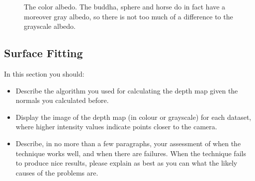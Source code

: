 \documentclass{paper}
\begin{document}
\begin{figure}[h!]
\begin{subfigure}{0.3\textwidth}
        \end{subfigure}
        \caption{The color albedo. The buddha, sphere and horse
        do in fact have a moreover gray albedo, so there is not too much
        of a difference to the grayscale albedo.}
        \label{fig:color_albedo}
\end{figure}

\subsection{Surface Fitting}

In this section you should:

\begin{itemize}
\item Describe the algorithm you used for calculating the depth map given the normals you calculated before.
\item Display the image of the depth map (in colour or grayscale) for each dataset, where higher intensity values indicate points closer to the camera.
\item Describe, in no more than a few paragraphs, your assessment of when the technique works well, and when there are failures. When the technique fails to produce nice results, please explain as best as you can what the likely causes of the problems are.
\end{itemize}















 
\end{document}
